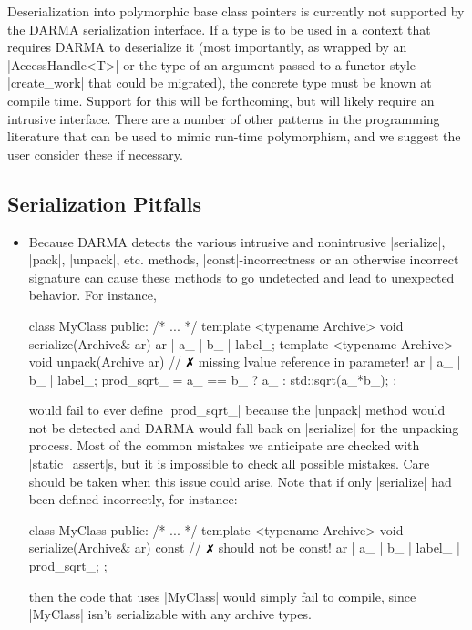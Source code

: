 Deserialization into polymorphic base class pointers is currently not supported
by the DARMA serialization interface.  If a type is to be used in a context that
requires DARMA to deserialize it (most importantly, as wrapped by an
|AccessHandle<T>| or the type of an argument passed to a
functor-style |create_work| that could be migrated), the concrete type must be
known at compile time.  Support for this will be forthcoming, but will likely require an intrusive interface.  
There are a number of other patterns in the programming
literature that can be used to mimic run-time polymorphism, and we suggest the
user consider these if necessary.

\subsection{Serialization Pitfalls}

\begin{itemize}
  \item Because DARMA detects the various intrusive and nonintrusive
  |serialize|, |pack|, |unpack|, etc. methods, |const|-incorrectness or an
  otherwise incorrect signature can cause these methods to go undetected and
  lead to unexpected behavior.  For instance,
\begin{CppCodeNumb}
class MyClass {
  public:
    /* ... */
    template <typename Archive>
    void serialize(Archive& ar) {
      ar | a_ | b_ | label_;
    }
    template <typename Archive>
    void unpack(Archive ar) { // $\no$ missing lvalue reference in parameter!
      ar | a_ | b_ | label_;
      prod_sqrt_ = a_ == b_ ? a_ : std::sqrt(a_*b_);
    }
};
\end{CppCodeNumb}
would fail to ever define |prod_sqrt_| because the |unpack| method would not be
detected and DARMA would fall back on |serialize| for the unpacking process. 
Most of the common mistakes we anticipate are checked with |static_assert|s, but
it is impossible to check all possible mistakes.  Care should be taken when this
issue could arise.  Note that if only |serialize| had been defined incorrectly,
for instance:
\begin{CppCodeNumb}
class MyClass {
  public:
    /* ... */
    template <typename Archive>
    void serialize(Archive& ar) const { // $\no$ should not be const!
      ar | a_ | b_ | label_ | prod_sqrt_;
    }
};
\end{CppCodeNumb}
then the code that uses |MyClass| would simply fail to compile, since |MyClass|
isn't serializable with any archive types.
\end{itemize}

\lstDeleteShortInline{\|}
